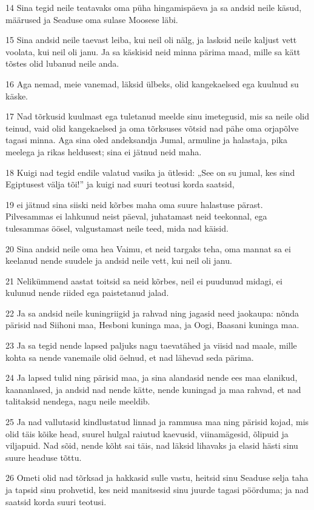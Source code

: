 \par 14 Sina tegid neile teatavaks oma püha hingamispäeva ja sa andsid neile käsud, määrused ja Seaduse oma sulase Moosese läbi.
\par 15 Sina andsid neile taevast leiba, kui neil oli nälg, ja lasksid neile kaljust vett voolata, kui neil oli janu. Ja sa käskisid neid minna pärima maad, mille sa kätt tõstes olid lubanud neile anda.
\par 16 Aga nemad, meie vanemad, läksid ülbeks, olid kangekaelsed ega kuulnud su käske.
\par 17 Nad tõrkusid kuulmast ega tuletanud meelde sinu imetegusid, mis sa neile olid teinud, vaid olid kangekaelsed ja oma tõrksuses võtsid nad pähe oma orjapõlve tagasi minna. Aga sina oled andeksandja Jumal, armuline ja halastaja, pika meelega ja rikas heldusest; sina ei jätnud neid maha.
\par 18 Kuigi nad tegid endile valatud vasika ja ütlesid: „See on su jumal, kes sind Egiptusest välja tõi!” ja kuigi nad suuri teotusi korda saatsid,
\par 19 ei jätnud sina siiski neid kõrbes maha oma suure halastuse pärast. Pilvesammas ei lahkunud neist päeval, juhatamast neid teekonnal, ega tulesammas öösel, valgustamast neile teed, mida nad käisid.
\par 20 Sina andsid neile oma hea Vaimu, et neid targaks teha, oma mannat sa ei keelanud nende suudele ja andsid neile vett, kui neil oli janu.
\par 21 Nelikümmend aastat toitsid sa neid kõrbes, neil ei puudunud midagi, ei kulunud nende riided ega paistetanud jalad.
\par 22 Ja sa andsid neile kuningriigid ja rahvad ning jagasid need jaokaupa: nõnda pärisid nad Siihoni maa, Hesboni kuninga maa, ja Oogi, Baasani kuninga maa.
\par 23 Ja sa tegid nende lapsed paljuks nagu taevatähed ja viisid nad maale, mille kohta sa nende vanemaile olid öelnud, et nad lähevad seda pärima.
\par 24 Ja lapsed tulid ning pärisid maa, ja sina alandasid nende ees maa elanikud, kaananlased, ja andsid nad nende kätte, nende kuningad ja maa rahvad, et nad talitaksid nendega, nagu neile meeldib.
\par 25 Ja nad vallutasid kindlustatud linnad ja rammusa maa ning pärisid kojad, mis olid täis kõike head, suurel hulgal raiutud kaevusid, viinamägesid, õlipuid ja viljapuid. Nad sõid, nende kõht sai täis, nad läksid lihavaks ja elasid hästi sinu suure headuse tõttu.
\par 26 Ometi olid nad tõrksad ja hakkasid sulle vastu, heitsid sinu Seaduse selja taha ja tapsid sinu prohvetid, kes neid manitsesid sinu juurde tagasi pöörduma; ja nad saatsid korda suuri teotusi.

